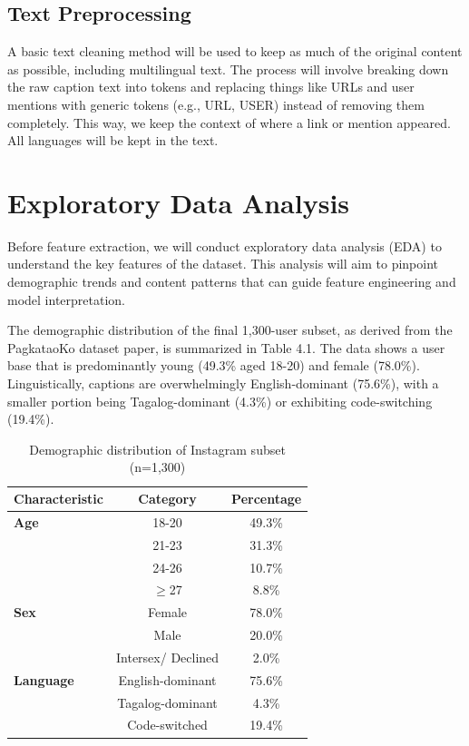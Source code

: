 \subsection{Text Preprocessing}
A basic text cleaning method will be used to keep as much of the original content as possible, including multilingual text. The process will involve breaking down the raw caption text into tokens and replacing things like URLs and user mentions with generic tokens (e.g., URL, USER) instead of removing them completely. This way, we keep the context of where a link or mention appeared. All languages will be kept in the text.


\section{Exploratory Data Analysis}
\label{subsec:eda}

Before feature extraction, we will conduct exploratory data analysis (EDA) to understand the key features of the dataset. This analysis will aim to pinpoint demographic trends and content patterns that can guide feature engineering and model interpretation.

The demographic distribution of the final 1,300-user subset, as derived from the PagkataoKo dataset paper, is summarized in Table 4.1. The data shows a user base that is predominantly young (49.3\% aged 18-20) and female (78.0\%). Linguistically, captions are overwhelmingly English-dominant (75.6\%), with a smaller portion being Tagalog-dominant (4.3\%) or exhibiting code-switching (19.4\%).

\begin{table}[h]
	\centering
	\caption{Demographic distribution of Instagram subset (n=1,300)}
	\label{tab:demo}
	\begin{tabular}{lcc}
		\hline
		\textbf{Characteristic} & \textbf{Category} & \textbf{Percentage} \\ \hline
		\textbf{Age} & 18-20 & 49.3\% \\
		& 21-23 & 31.3\% \\
		& 24-26 & 10.7\% \\
		& $\geq$27 & 8.8\% \\ \hline
		\textbf{Sex} & Female & 78.0\% \\
		& Male & 20.0\% \\
		& Intersex/ Declined & 2.0\% \\ \hline
		\textbf{Language} & English-dominant & 75.6\% \\
		& Tagalog-dominant & 4.3\% \\
		& Code-switched & 19.4\% \\ \hline
	\end{tabular}
\end{table}



